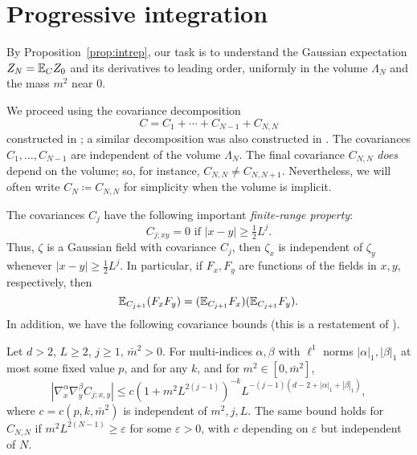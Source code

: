 
\section{Progressive integration}
\label{sec:prog}

By Proposition~\ref{prop:intrep}, our task is to understand the Gaussian expectation
$Z_N = \mathbb{E}_C Z_0$ and its derivatives to leading order, uniformly in the volume
$\Lambda_N$ and the mass $m^2$ near $0$.

We proceed using the covariance decomposition
\begin{equation}
\label{e:NCj}
C = C_1 + \cdots + C_{N-1} + C_{N,N}
\end{equation}
constructed in \cite{Baue13a}; a similar decomposition was also constructed in \cite{BGM04}.
The covariances $C_1, \ldots, C_{N-1}$ are independent of the volume $\Lambda_N$. The final
covariance $C_{N,N}$ \emph{does} depend on the volume; so, for instance, $C_{N,N} \ne C_{N,N+1}$.
Nevertheless, we will often write $C_N \coloneqq C_{N,N}$ for simplicity when the volume is implicit.

The covariances $C_j$ have the following important \emph{finite-range property}:
\begin{equation}
C_{j;xy} = 0 \text{ if } |x - y| \ge \tfrac12 L^j.
\end{equation}
Thus, $\zeta$ is a Gaussian field with covariance $C_j$, then $\zeta_x$ is independent
of $\zeta_y$ whenever $|x - y| \ge \tfrac12 L^j$. In particular,
if $F_x, F_y$ are functions of the fields in $x, y$, respectively, then
\begin{equation}
\label{e:uncorr}
\mathbb{E}_{C_{j+1}} (F_x F_y) = (\mathbb{E}_{C_{j+1}} F_x) (\mathbb{E}_{C_{j+1}} F_y).
\end{equation}
In addition, we have the following covariance bounds (this is a restatement of
\cite[Proposition~\ref{pt-prop:Cdecomp}(a)]{BBS-rg-pt}).

\begin{prop}
\label{prop:Cdecomp}
  Let $d >2$, $L\geq 2$, $j \ge 1$, $\bar m^2 >0$.
  For multi-indices $\alpha,\beta$ with
  $\ell^1$ norms $|\alpha|_1,|\beta|_1$ at most
  some fixed value $p$,
  and for any $k$, and for $m^2 \in [0,\bar m^2]$,
  \begin{equation}
    \label{e:scaling-estimate}
    |\nabla_x^\alpha \nabla_y^\beta C_{j;x,y}|
    \leq c(1+m^2L^{2(j-1)})^{-k}
    L^{-(j-1)(d-2 +|\alpha|_1+|\beta|_1)},
  \end{equation}
  where $c=c(p,k,\bar m^2)$ is independent of $m^2,j,L$.
  The same bound holds for $C_{N,N}$ if
  $m^2L^{2(N-1)} \ge \varepsilon$ for some $\varepsilon >0$,
  with $c$ depending on $\varepsilon$ but independent of $N$.
\end{prop}

